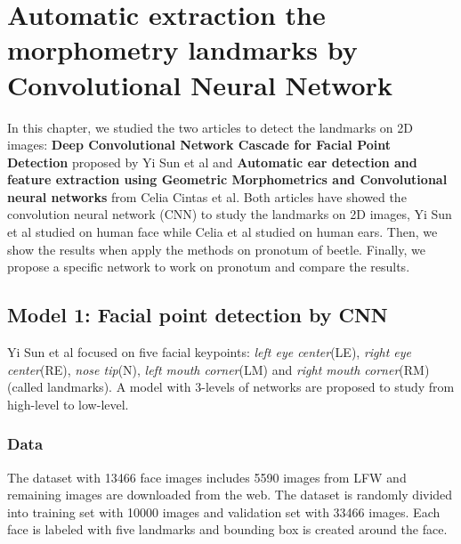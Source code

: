 \chapter{Automatic extraction the morphometry landmarks by Convolutional Neural Network}

In this chapter, we studied the two articles to detect the landmarks on 2D images: \textbf{Deep Convolutional Network Cascade for Facial Point Detection} proposed by Yi Sun et al\cite{sun2013deep} and \textbf{Automatic ear detection and feature extraction using Geometric Morphometrics and Convolutional neural networks} from Celia Cintas et al\cite{cintas2016automatic}. Both articles have showed the convolution neural network (CNN) to study the landmarks on 2D images, Yi Sun et al studied on human face while Celia et al studied on human ears. Then, we show the results when apply the methods on pronotum of beetle. Finally, we propose a specific network to work on pronotum and compare the results.
\section{Model 1: Facial point detection by CNN}
Yi Sun et al\cite{sun2013deep} focused on five facial keypoints: \textit{left eye center}(LE), \textit{right eye center}(RE), \textit{nose tip}(N), \textit{left mouth corner}(LM) and \textit{right mouth corner}(RM) (called landmarks). A model with 3-levels of networks are proposed to study from high-level to low-level.
\subsection{Data}
The dataset with 13466 face images includes 5590 images from LFW \cite{huang2007labeled} and remaining images are downloaded from the web. The dataset is randomly divided into training set with 10000 images and validation set with 33466 images. Each face is labeled with five landmarks and bounding box is created around the face.
